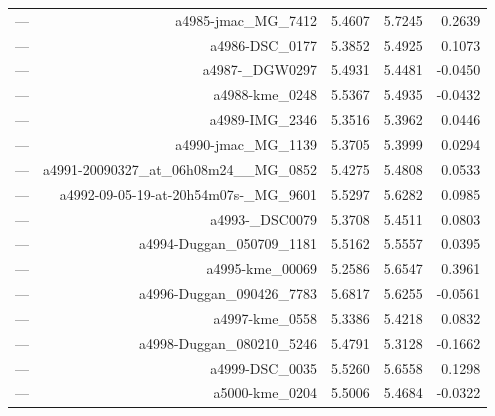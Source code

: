\begin{table}[htbp]
\begin{tabular}{lrrrr}
— & a4985-jmac_MG_7412 & 5.4607 & 5.7245 & 0.2639 \\
— & a4986-DSC_0177 & 5.3852 & 5.4925 & 0.1073 \\
— & a4987-_DGW0297 & 5.4931 & 5.4481 & -0.0450 \\
— & a4988-kme_0248 & 5.5367 & 5.4935 & -0.0432 \\
— & a4989-IMG_2346 & 5.3516 & 5.3962 & 0.0446 \\
— & a4990-jmac_MG_1139 & 5.3705 & 5.3999 & 0.0294 \\
— & a4991-20090327_at_06h08m24__MG_0852 & 5.4275 & 5.4808 & 0.0533 \\
— & a4992-09-05-19-at-20h54m07s-_MG_9601 & 5.5297 & 5.6282 & 0.0985 \\
— & a4993-_DSC0079 & 5.3708 & 5.4511 & 0.0803 \\
— & a4994-Duggan_050709_1181 & 5.5162 & 5.5557 & 0.0395 \\
— & a4995-kme_00069 & 5.2586 & 5.6547 & 0.3961 \\
— & a4996-Duggan_090426_7783 & 5.6817 & 5.6255 & -0.0561 \\
— & a4997-kme_0558 & 5.3386 & 5.4218 & 0.0832 \\
— & a4998-Duggan_080210_5246 & 5.4791 & 5.3128 & -0.1662 \\
— & a4999-DSC_0035 & 5.5260 & 5.6558 & 0.1298 \\
— & a5000-kme_0204 & 5.5006 & 5.4684 & -0.0322 \\
\bottomrule
\end{tabular}
\end{table}
